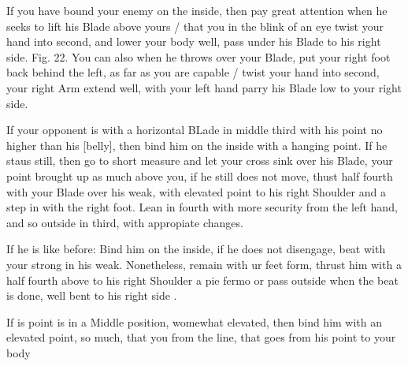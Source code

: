 If you have bound your enemy on the inside, then pay great attention
when he seeks to lift his Blade above yours / that you in the blink of
an eye twist your hand into second, and lower your body well, pass
under his Blade to his right side. Fig. 22. You can also when he
throws over your Blade, put your right foot back behind the left, as
far as you are capable / twist your hand into second, your right Arm
extend well, with your left hand parry his Blade low to your right
side.




If your opponent is with a horizontal BLade in middle third with his
point no higher than his [belly], then bind him on
the inside with a hanging point. If he staus still, then go to short
measure and let your cross sink over his Blade, your point brought up
as much above you, if he still does not move, thust half fourth with
your Blade over his weak, with elevated point to his right Shoulder
and a step in with the right foot. Lean in fourth with more security
from the left hand, and so outside in third, with appropiate changes.

\exercise{}


If he is like before: Bind him on the inside, if he does not
disengage, beat with your strong in his weak. Nonetheless, remain with
ur feet form, thrust him with a half fourth above to his right
Shoulder a pie fermo or pass outside when the beat is done, well bent
to his right side .

\exercise{}


If is point is in a Middle position, womewhat elevated, then bind him
with an elevated point, so much, that you from the line, that goes
from his point to your body
